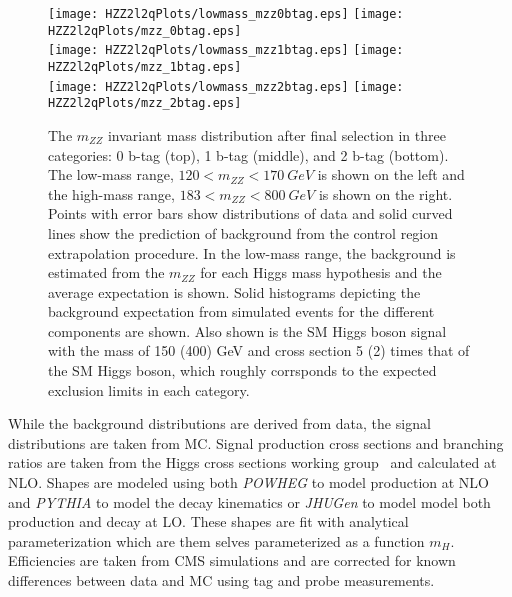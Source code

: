 \begin{figure}
\begin{center}
\texttt{[image: HZZ2l2qPlots/lowmass\_mzz0btag.eps]}
\texttt{[image: HZZ2l2qPlots/mzz\_0btag.eps]}\\
\texttt{[image: HZZ2l2qPlots/lowmass\_mzz1btag.eps]}
\texttt{[image: HZZ2l2qPlots/mzz\_1btag.eps]}\\
\texttt{[image: HZZ2l2qPlots/lowmass\_mzz2btag.eps]}
\texttt{[image: HZZ2l2qPlots/mzz\_2btag.eps]}
\label{fig:HZZ2l2qMassDistributions}
\caption{The $m_{ZZ}$ invariant mass distribution after final selection in
three categories: 0 b-tag (top), 1 b-tag (middle), and 2 b-tag (bottom). 
The low-mass range, $120<m_{ZZ}<170~GeV$ is shown on the left and the
high-mass range, $183<m_{ZZ}<800~GeV$ is shown on the right.  Points with
error bars show distributions of data and solid curved lines show the 
prediction of background from the control region extrapolation procedure.
In the low-mass range, the background is estimated from the $m_{ZZ}$ for
each Higgs mass hypothesis and the average expectation is shown.  Solid
histograms depicting the background expectation from simulated events
for the different components are shown.  Also shown is the SM Higgs boson
signal with the mass of 150 (400) GeV and cross section 5 (2) times that 
of the SM Higgs boson, which roughly corrsponds to the expected exclusion 
limits in each category.}
\end{center}
\end{figure}

While the background distributions are derived from data, the signal
distributions are taken from MC.  Signal production cross sections
and branching ratios are taken from the Higgs cross sections working
group~\cite{??} and calculated at NLO.  Shapes are modeled using both
{\it POWHEG} to model production at NLO and {\it PYTHIA} to model the 
decay kinematics or {\it JHUGen} to model model both production and
decay at LO.  These shapes are fit with analytical parameterization
which are them selves parameterized as a function $m_H$.  Efficiencies 
are taken from CMS simulations and are
corrected for known differences between data and MC using tag and
probe measurements.  

